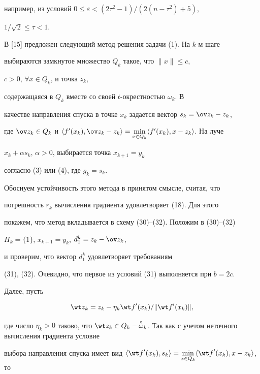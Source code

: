 например, из условий $0\le\varepsilon<(2\tau^2-1)/(2(n-\tau^2)+5)$,


$1/\sqrt{2}\le\tau<1$.





В [15] предложен следующий метод решения задачи (1). На $k$-м шаге


выбираются замкнутое множество $Q_k$ такое, что $\|{x}\|\le c$,


$c>0$, $\forall x\in Q_k$, и точка $z_k$,


содержащаяся в $Q_k$ вместе со своей $t$-окрестностью $\omega_k$. В


качестве направления спуска в точке $x_k$ задается вектор $s_k=\ov z_k-z_k$,


где $\ov z_k\in Q_k$ и $\langle {{f}'(x_k),\ov z_k-z_k}\rangle


=\min\limits_{x\in Q_k}\langle {{f}'(x_k),x-z_k}\rangle$. На луче


$x_k+\alpha s_k$, $\alpha >0$, выбирается точка $x_{k+1}=y_k$


согласно (3) или (4), где $g_k=s_k$.





Обоснуем устойчивость этого метода в принятом смысле, считая, что


погрешность $r_k$ вычисления градиента удовлетворяет (18). Для этого


покажем, что метод вкладывается в схему (30)--(32). Положим в (30)--(32)


$H_k=\{1\}$, $x_{k+1}=y_k$, $d_1^k=z_k-\ov z_k$,


и проверим, что вектор $d_1^k$ удовлетворяет требованиям


(31), (32). Очевидно, что первое из условий (31) выполняется при $b=2c$.


Далее, пусть


$$


\wt z_k=z_k-\eta_k {\wt f}'(x_k)/\|{{\wt f}'(x_k)}\|,


$$


где число $\eta_k>0$ таково, что $\wt z_k\in Q_k-\overset{\circ}


{\omega}_k$. Так как с учетом неточного вычисления градиента условие


выбора направления спуска имеет вид $\langle {{\wt f}'(x_k),s_k}


\rangle =\min\limits_{x\in Q_k}\langle {{\wt f}'(x_k),x-z_k}


\rangle$, то


